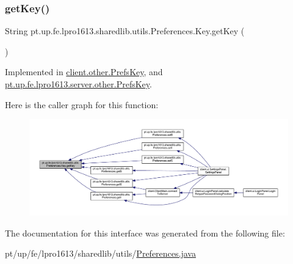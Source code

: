 \subsubsection{\texorpdfstring{get\+Key()}{getKey()}}
{\footnotesize\ttfamily String pt.\+up.\+fe.\+lpro1613.\+sharedlib.\+utils.\+Preferences.\+Key.\+get\+Key (\begin{DoxyParamCaption}{ }\end{DoxyParamCaption})}



Implemented in \hyperlink{enumclient_1_1other_1_1_prefs_key_a204beaf7ef2607c5ee052bf712d5fc66}{client.\+other.\+Prefs\+Key}, and \hyperlink{enumpt_1_1up_1_1fe_1_1lpro1613_1_1server_1_1other_1_1_prefs_key_ab78cc090bf215b90b4387473ae17524a}{pt.\+up.\+fe.\+lpro1613.\+server.\+other.\+Prefs\+Key}.

Here is the caller graph for this function\+:
\nopagebreak
\begin{figure}[H]
\begin{center}
\leavevmode
\includegraphics[width=350pt]{interfacept_1_1up_1_1fe_1_1lpro1613_1_1sharedlib_1_1utils_1_1_preferences_1_1_key_af244cecb8edad1f87eaaa517c3590507_icgraph}
\end{center}
\end{figure}


The documentation for this interface was generated from the following file\+:\begin{DoxyCompactItemize}
\item 
pt/up/fe/lpro1613/sharedlib/utils/\hyperlink{_preferences_8java}{Preferences.\+java}\end{DoxyCompactItemize}
